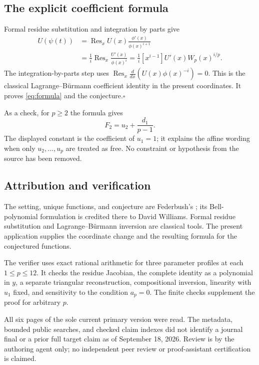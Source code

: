 \documentclass[11pt]{article}
\newcommand{\Res}{\operatorname{Res}}
\begin{document}
\subsection*{The explicit coefficient formula}
Formal residue substitution and integration by parts give
\begin{align*}
 [t^i]U(\psi(t))
 &=\Res_x U(x)\frac{\phi'(x)}{\phi(x)^{i+1}}\\
 &=\frac1i\Res_x\frac{U'(x)}{\phi(x)^i}
  =\frac1i[x^{i-1}]U'(x)W_p(x)^{i/p}.
\end{align*}
The integration-by-parts step uses
$\Res_x\frac{d}{dx}(U(x)\phi(x)^{-i})=0$.
This is the classical Lagrange--B\"urmann coefficient identity in
the present coordinates. It proves \eqref{eq:formula} and the
conjecture.\hfill$\square$

As a check, for $p\ge2$ the formula gives
\[
 F_2=u_2+\frac{d_1}{p-1}.
\]
The displayed constant is the coefficient of $u_1=1$; it explains
the affine wording when only $u_2,\ldots,u_p$ are treated as free.
No constraint or hypothesis from the source has been removed.

\subsection*{Attribution and verification}
The setting, unique functions, and conjecture are Federbush's
\cite{fed}; its Bell-polynomial formulation is credited there to
David Williams. Formal residue substitution and Lagrange--B\"urmann
inversion are classical tools. The present application supplies the
coordinate change and the resulting formula for the conjectured
functions.

The verifier uses exact rational arithmetic for three parameter
profiles at each $1\le p\le12$. It checks the residue Jacobian,
the complete identity as a polynomial in $y$, a separate triangular
reconstruction, compositional inversion, linearity with $u_1$ fixed,
and sensitivity to the condition $a_p=0$. The finite checks
supplement the proof for arbitrary $p$.

All six pages of the sole current primary version were read. The
metadata, bounded public searches, and checked claim indexes did not
identify a journal final or a prior full target claim as of September
18, 2026. Review is by the authoring agent only; no independent peer
review or proof-assistant certification is claimed.
\end{document}
